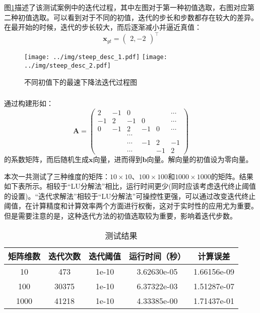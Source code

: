 \documentclass[12pt, onecolumn]{article}
\newcommand\normf{\fangsong}
\begin{document}
	图\ref{fig:最速下降法迭代过程图}描述了该测试案例中的迭代过程，其中左图对于第一种初值选取，右图对应第二种初值选取。可以看到对于不同的初值，迭代的步长和步数都存在较大的差异。在最开始的时候，迭代的步长较大，而后逐渐减小并逼近真值：
	\begin{equation}
	\boldsymbol{x}_{gt}=\begin{pmatrix}
	2,-2
	\end{pmatrix}^\top
	\end{equation}
		\begin{figure}[h]
			\centering
			\texttt{[image: ../img/steep\_desc\_1.pdf]}
			\texttt{[image: ../img/steep\_desc\_2.pdf]}
			\caption{\normf 不同初值下的最速下降法迭代过程图}
			\label{fig:最速下降法迭代过程图}
		\end{figure}
	
	\subsubsection{\normf{大型稀疏矩阵测试}}
	通过构建形如：
	\begin{equation}
	\boldsymbol{A}=\begin{pmatrix}
	2&-1&0&&&\cdots\\
	-1&2&-1&0&&\cdots\\
	0&-1&2&-1&0&\cdots\\
	&&\cdots\\
	&&\cdots&-1&2&-1\\
	&&\cdots&&-1&2
	\end{pmatrix}
	\end{equation}
	的系数矩阵，而后随机生成$\boldsymbol{x}$向量，进而得到$\boldsymbol{b}$向量。解向量的初值设为零向量。
	
	本次一共测试了三种维度的矩阵：$10\times 10$、$100\times 100$和$1000\times 1000$的矩阵。结果如下表所示。相较于“LU分解法”相比，运行时间更少(同时应该考虑迭代终止阈值的设置)。“迭代求解法”相较于“LU分解法”可操控性更强，可以通过改变迭代终止阈值，在计算精度和计算效率两个方面进行权衡，这对于实时性的应用尤为重要。但是需要注意的是，这种迭代方法的初值选取较为重要，影响着迭代步数。
	\begin{table}[h]
	\normf
	\centering
	\caption{\normf 测试结果}
	\vspace{2mm}
	\begin{tabular}{c|cccc}
	\toprule
	矩阵维数 & 迭代次数  & 迭代阈值  & 运行时间（秒）     & 计算误差        \\ \midrule
	10   & 473   & 1e-10 & 3.62630e-05 & 1.66156e-09 \\
	100  & 30375 & 1e-10 & 6.37322e-03 & 1.51287e-07 \\
	1000 & 41218 & 1e-10 & 4.33385e-00 & 1.71437e-01 \\ \bottomrule
	\end{tabular}
	\end{table}
	
\end{document}
